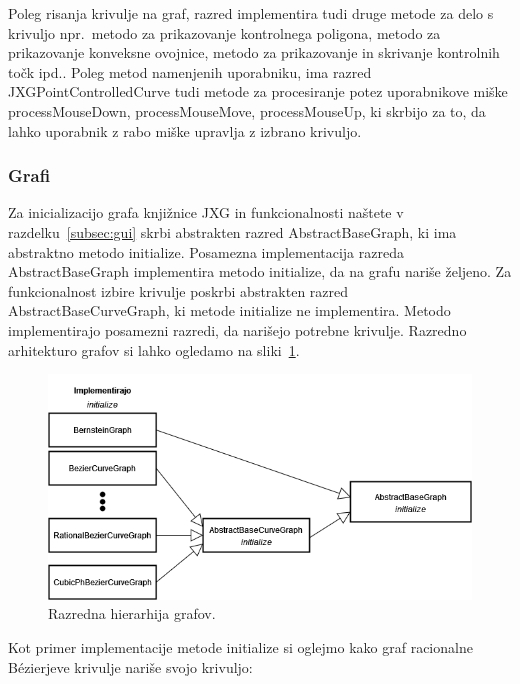 \documentclass[isrm2, tisk]{fmfdelo}
\begin{document}
    Poleg risanja krivulje na graf, razred implementira tudi druge metode za delo s krivuljo npr.\ metodo za prikazovanje kontrolnega poligona, metodo za prikazovanje konveksne ovojnice, metodo za prikazovanje in skrivanje kontrolnih točk ipd..
    Poleg metod namenjenih uporabniku, ima razred JXGPointControlledCurve tudi metode za procesiranje potez uporabnikove miške processMouseDown, processMouseMove, processMouseUp, ki skrbijo za to, da lahko uporabnik z rabo miške upravlja z izbrano krivuljo.

    \subsubsection{Grafi}
    Za inicializacijo grafa knjižnice JXG in funkcionalnosti naštete v razdelku~\ref{subsec:gui} skrbi abstrakten razred AbstractBaseGraph, ki ima abstraktno metodo initialize.
    Posamezna implementacija razreda AbstractBaseGraph implementira metodo initialize, da na grafu nariše željeno.
    Za funkcionalnost izbire krivulje poskrbi abstrakten razred AbstractBaseCurveGraph, ki metode initialize ne implementira.
    Metodo implementirajo posamezni razredi, da narišejo potrebne krivulje.
    Razredno arhitekturo grafov si lahko ogledamo na sliki~\ref{fig:hiearhija-krivulj}.
    \begin{figure}[h!]
        \centering
        \includegraphics[width = \textwidth]{drawio/graph-hierarhija.drawio}
        \caption{Razredna hierarhija grafov.}
        \label{fig:hiearhija-krivulj}
    \end{figure}
    Kot primer implementacije metode initialize si oglejmo kako graf racionalne Bézierjeve krivulje nariše svojo krivuljo:
\end{document}
